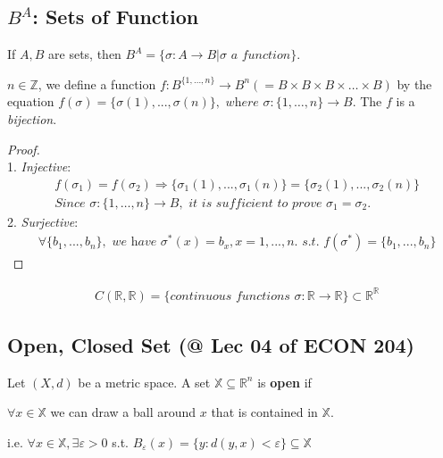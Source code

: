 \documentclass[11pt]{elegantbook}
\begin{document}
\subsection{$B^A$: Sets of Function}
If $A,B$ are sets, then $B^A=\{\sigma:A \rightarrow B| \sigma \textit{ a function}\}$.
\begin{example}
    $n\in \mathbb{Z}$, we define a function $f: B^{\{1,\dots,n\}} \rightarrow B^n(=B\times B\times B\times \dots \times B)$ by the equation
    $f(\sigma)=\{\sigma(1),...,\sigma(n)\}, \textit{ where }\sigma:\{1,\dots,n\} \rightarrow B$. The $f$ is a \textit{bijection}.
\end{example}
\begin{proof}
    \quad\\
    1. \textit{Injective}:
    \begin{equation}
        \begin{aligned}
            &f(\sigma_1)=f(\sigma_2)
            \Rightarrow \{\sigma_1(1),...,\sigma_1(n)\}=\{\sigma_2(1),...,\sigma_2(n)\}\\
            &\textit{Since }\sigma:\{1,\dots,n\} \rightarrow B,\textit{ it is sufficient to prove }\sigma_1=\sigma_2.
        \end{aligned}
        \nonumber
    \end{equation}
    2. \textit{Surjective}:
    \begin{equation}
        \begin{aligned}
            &\forall \{b_1,...,b_n\},\textit{ we have }\sigma^*(x)=b_x,x=1,...,n.\textit{ s.t. }f(\sigma^*)=\{b_1,...,b_n\}
        \end{aligned}
        \nonumber
    \end{equation}

\end{proof}
\begin{example}
    \begin{equation}
        \begin{aligned}
            & C(\mathbb{R},\mathbb{R})=\{\textit{continuous functions }\sigma:\mathbb{R} \rightarrow \mathbb{R} \}\subset \mathbb{R}^\mathbb{R}
        \end{aligned}
        \nonumber
    \end{equation}
\end{example}

\subsection{Open, Closed Set \small{(@ Lec 04 of ECON 204)}}
\begin{definition}
    Let $(X, d)$ be a metric space. A set $\mathbb{X} \subseteq \mathbb{R}^{n}$ is \textbf{open} if
    
    $\forall x \in \mathbb{X}$ we can draw a ball around $x$ that is contained in $\mathbb{X}$.

    i.e. $\forall x \in \mathbb{X}, \exists \varepsilon>0$ s.t. $B_\varepsilon(x)=\{y:d(y,x)<\varepsilon\} \subseteq \mathbb{X}$
\end{definition}
\end{document}
